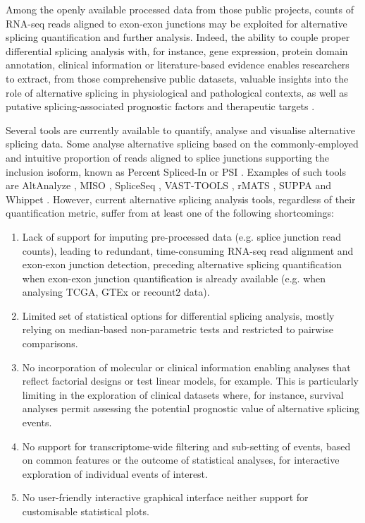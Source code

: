 Among the openly available processed data from those public projects, counts of RNA-seq reads aligned to exon-exon junctions may be exploited for alternative splicing quantification and further analysis. Indeed, the ability to couple proper differential splicing analysis with, for instance, gene expression, protein domain annotation, clinical information or literature-based evidence enables researchers to extract, from those comprehensive public datasets, valuable insights into the role of alternative splicing in physiological and pathological contexts, as well as putative splicing-associated prognostic factors and therapeutic targets \cite{tsai:2015ve,danan-gotthold:2015ut,chhibber:2017wm,climente-gonzalez:2017uj,anczukow:2015vl}.

Several tools are currently available to quantify, analyse and visualise alternative splicing data. Some analyse alternative splicing based on the commonly-employed and intuitive proportion of reads aligned to splice junctions supporting the inclusion isoform, known as Percent Spliced-In or PSI \cite{wang:2008wa}. Examples of such tools are AltAnalyze \cite{emig:2010ws}, MISO \cite{katz:2010tj}, SpliceSeq \cite{ryan:2012ts}, VAST-TOOLS \cite{irimia:2014wt}, rMATS \cite{shen:2014tk}, SUPPA \cite{alamancos:2015vc} and Whippet \cite{sterne-weiler:2018tk}. However, current alternative splicing analysis tools, regardless of their quantification metric, suffer from at least one of the following shortcomings:

\begin{enumerate}
	\item Lack of support for imputing pre-processed data (e.g. splice junction read counts), leading to redundant, time-consuming RNA-seq read alignment and exon-exon junction detection, preceding alternative splicing quantification when exon-exon junction quantification is already available (e.g. when analysing TCGA, GTEx or recount2 data).
	\item Limited set of statistical options for differential splicing analysis, mostly relying on median-based non-parametric tests and restricted to pairwise comparisons.
	\item No incorporation of molecular or clinical information enabling analyses that reflect factorial designs or test linear models, for example. This is particularly limiting in the exploration of clinical datasets where, for instance, survival analyses permit assessing the potential prognostic value of alternative splicing events.
	\item No support for transcriptome-wide filtering and sub-setting of events, based on common features or the outcome of statistical analyses, for interactive exploration of individual events of interest.
	\item No user-friendly interactive graphical interface neither support for customisable statistical plots.
\end{enumerate}

